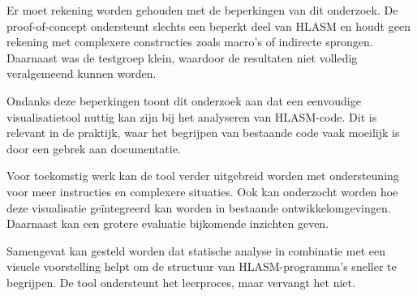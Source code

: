 Er moet rekening worden gehouden met de beperkingen van dit onderzoek. De proof-of-concept ondersteunt slechts een beperkt deel van HLASM en houdt geen rekening met complexere constructies zoals macro’s of indirecte sprongen. Daarnaast was de testgroep klein, waardoor de resultaten niet volledig veralgemeend kunnen worden.

Ondanks deze beperkingen toont dit onderzoek aan dat een eenvoudige visualisatietool nuttig kan zijn bij het analyseren van HLASM-code. Dit is relevant in de praktijk, waar het begrijpen van bestaande code vaak moeilijk is door een gebrek aan documentatie.

Voor toekomstig werk kan de tool verder uitgebreid worden met ondersteuning voor meer instructies en complexere situaties. Ook kan onderzocht worden hoe deze visualisatie geïntegreerd kan worden in bestaande ontwikkelomgevingen. Daarnaast kan een grotere evaluatie bijkomende inzichten geven.

Samengevat kan gesteld worden dat statische analyse in combinatie met een visuele voorstelling helpt om de structuur van HLASM-programma’s sneller te begrijpen. De tool ondersteunt het leerproces, maar vervangt het niet.